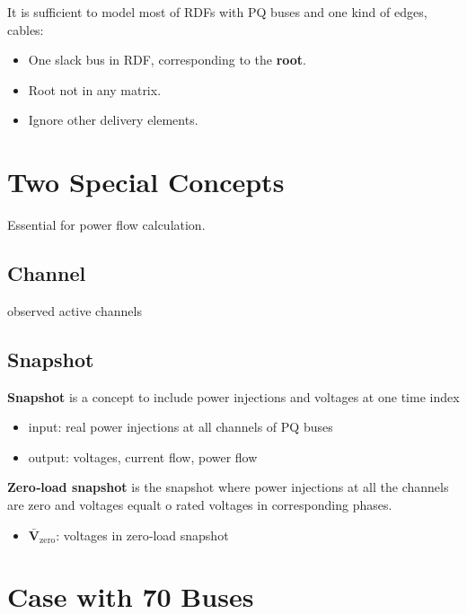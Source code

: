 \documentclass[
]{book}
\providecommand{\tightlist}{%
  \setlength{\itemsep}{0pt}\setlength{\parskip}{0pt}}
\begin{document}
It is sufficient to model most of RDFs with PQ buses and one kind of edges,
cables:

\begin{itemize}
\tightlist
\item
  One slack bus in RDF, corresponding to the \textbf{root}.
\item
  Root not in any matrix.
\item
  Ignore other delivery elements.
\end{itemize}

\hypertarget{two-special-concepts}{%
\section{Two Special Concepts}\label{two-special-concepts}}

Essential for power flow calculation.

\hypertarget{channel}{%
\subsection{Channel}\label{channel}}

observed active channels

\hypertarget{snapshot}{%
\subsection{Snapshot}\label{snapshot}}

\textbf{Snapshot} is a concept to include power injections and voltages at one time
index

\begin{itemize}
\tightlist
\item
  input: real power injections at all channels of PQ buses
\item
  output: voltages, current flow, power flow
\end{itemize}

\textbf{Zero‐load snapshot} is the snapshot where power injections at all the
channels are zero and voltages equalt o rated voltages in corresponding phases.

\begin{itemize}
\tightlist
\item
  \(\boldsymbol{\bar{V}}_\text{zero}\): voltages in zero‐load snapshot
\end{itemize}

\hypertarget{case}{%
\section{Case with 70 Buses}\label{case}}
\end{document}
